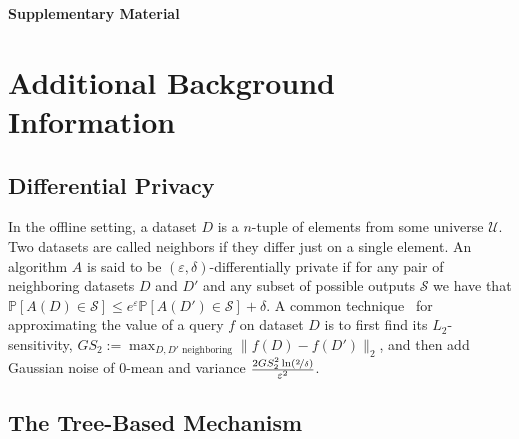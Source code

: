 \documentclass{article}
\renewcommand{\Pr}{\mathds{P}}
\begin{document}





{\small}


\cleardoublepage
\appendix
{}
{}
\begin{center}
  \LARGE\bf Supplementary Material
\end{center}


\section{Additional Background Information}
\label{apx_sec:more_background}

\subsection{Differential Privacy}
\label{apx_subsec:DP}

In the offline setting, a dataset $D$ is a $n$-tuple of elements from some universe $\mathcal{U}$. Two datasets are called neighbors if they differ just on a single element. An algorithm $A$ is said to be $(\varepsilon,\delta)$-differentially private if for any pair of neighboring datasets $D$ and $D'$ and any subset of possible outputs $\mathcal{S}$ we have that $\Pr[A(D)\in\mathcal{S}]\leq e^\varepsilon\Pr[A(D')\in\mathcal{S}] + \delta$. A common technique~\cite{DworkOurData2006} for approximating the value of a query $f$ on dataset $D$ is to first find its $L_2$-sensitivity, $GS_2 :=\max_{D,D'\textrm{ neighboring}} \|f(D)-f(D')\|_2$, and then add Gaussian noise of $0$-mean and variance $\tfrac{2GS_2^2\ln(\nicefrac 2 \delta)}{\varepsilon^2}$.

\subsection{The Tree-Based Mechanism}
\end{document}
